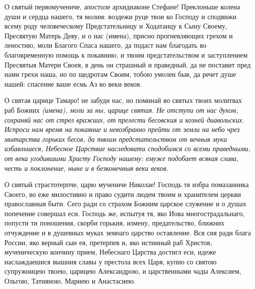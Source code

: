  
{\noparindent\hspace{0.15\textwidth}\begin{minipage}{0.7\textwidth}
\restoreparindent{}О святый первомучениче, апостоле архидиаконе Стефане! Преклоньше колена души и сердца нашего, тя молим: воздежи руце твои ко Господу и сподвижи всему роду человеческому Предстательницу и Ходатаицу к Сыну Своему, Пресвятую Матерь Деву, и о нас (имена), присно прогневляющих грехом и леностию, моли Благого Спаса нашего, да подаст нам благодать во благовременную помощь к покаянию, и твоим предстательством и заступлением Пресвятыя Матери Своея, в день он страшный и праведный, да не поставит пред нами грехи наша, но по щедротам Своим, тобою умолен быв, да речет душе нашей: спасение ваше есмь Аз во веки веков.
\end{minipage}\hspace{0.15\textwidth}}\mychapterending

 
О святая царице Тамаро! не забуди нас, но поминай во святых твоих молитвах раб Божиих \itshape (имена)\normalfont{}, моли за ны, царице святая. Не отступи от нас духом, сохраняй нас от стрел вражиих, от прелести бесовския и козней диавольских. Испроси нам время на покаяние и невозбранно прейти от земли на небо чрез мытарства горьких бесов, да твоим предстательством от вечныя муки избавльшеся, Небесное Царствие наследовати сподобимся со всеми праведными, от века угодившими Христу Господу нашему: емуже подобает всякая слава, честь и поклонение, ныне и в безконечныя веки веков.
\mychapterending

 



О святый страстотерпче, царю мучениче Николае! Господь тя избра помазанника Своего, во еже милостивно и право судити людем твоим и хранителем церкви православныя быти. Сего ради со страхом Божиим царское служение и о душах попечение совершал еси. Господь же, испытуя тя, яко Иова многострадальнаго, попусти ти поношения, скорби горькия, измену, предательство, ближних отчуждение и в душевных муках земнаго царство оставление. Вся сия ради блага России, яко верный сын ея, претерпев и, яко истинный раб Христов, мученическую кончину прием, Небеснаго Царства достигл еси, идеже наслаждаешися вышния славы у престола всех Царя, купно со святою супружницею твоею, царицею Александрою, и царственными чады Алексием, Ольгою, Татияною, Мариею и Анастасиею. 

